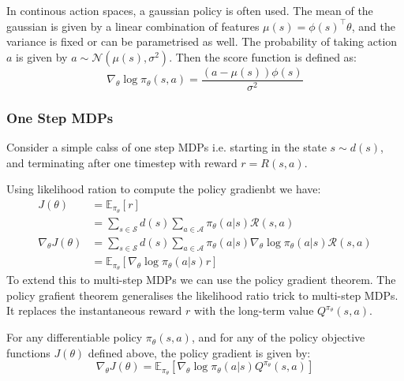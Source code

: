 \begin{example}
    In continous action spaces, a gaussian policy is often used. The mean of the gaussian is given by
    a linear combination of features \(\mu(s) = \phi(s)^{\top} \theta\), and the variance is fixed or
    can be parametrised as well. The probability of taking action \(a\) is given by \(a \sim 
    \mathcal{N}(\mu(s),\sigma^2)\). Then the score function is defined as:  
    \[
        \nabla _\theta \log \pi _\theta (s,a) = \frac{(a - \mu(s)) \phi(s)}{\sigma^2}
    \]
\end{example}

\subsubsection*{One Step MDPs}
Consider a simple calss of one step MDPs i.e. starting in the state \(s \sim d(s)\),
and terminating after one timestep with reward \(r = R(s,a)\). 

Using likelihood ration to compute the policy gradienbt we have:
\[
    \begin{aligned}
        J(\theta) &= \mathbb{E} _{\pi_\theta}[r] \\
        &= \sum_{s \in \mathcal{S}} d(s) \sum_{a \in \mathcal{A}} \pi_\theta(a|s) \mathcal{R}(s,a) \\
        \nabla_\theta J(\theta) &= \sum_{s \in \mathcal{S}} d(s) 
        \sum_{a \in \mathcal{A}} \pi _\theta (a|s) \nabla_\theta \log \pi _\theta (a|s) \mathcal{R}(s,a) \\
        &= \mathbb{E}_{\pi_\theta}
        \left[   
        \nabla_\theta \log \pi_\theta(a|s) r\right]
    \end{aligned}
\]
To extend this to multi-step MDPs we can use the policy gradient theorem. The policy grafient theorem
generalises the likelihood ratio trick to multi-step MDPs. It
replaces the instantaneous reward \(r\) with the long-term value \(Q^{\pi_\theta}(s,a)\).
\begin{theorem}
    For any differentiable policy \(\pi_\theta(s,a)\), and for any of the policy objective
    functions \(J(\theta)\) defined above, the policy gradient is given by:
    \[
        \nabla_\theta J(\theta) = \mathbb{E}_{\pi_\theta} \left[ 
            \nabla_\theta \log \pi_\theta(a|s) Q^{\pi_\theta}(s,a)
        \right]
    \]
\end{theorem}

